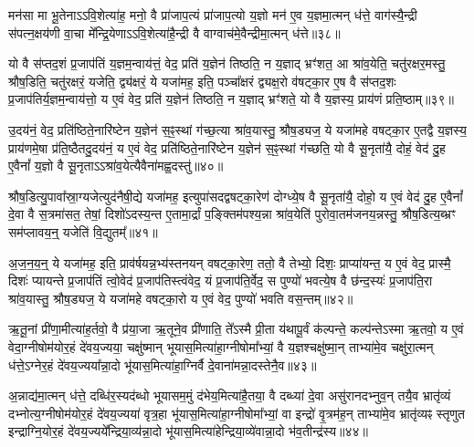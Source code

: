 मन॑सा मा भू॒तेना\-ऽ\-ऽवि॒शेत्या॑ह॒ मनो॒ वै प्रा॑जाप॒त्यं प्रा॑जाप॒त्यो य॒ज्ञो मन॑ ए॒व य॒ज्ञमा॒त्मन् ध॑त्ते॒ वाग॑स्यै॒न्द्री स॑पत्न॒क्षय॑णी वा॒चा मे᳚न्द्रि॒येणा\-ऽ\-ऽवि॒शेत्या॑है॒न्द्री वै वाग्वाच॑मे॒वैन्द्रीमा॒त्मन् ध॑त्ते॥३८॥

{\anuvakamend[{तेनै॒व ब्रह्म॑ रा॒ष्ट्रमे॒वास्य॑ य॒ज्ञस्य॑ प्राजाप॒त्यꣳ षट्त्रिꣳ॑शच्च॥10॥}]}

यो वै स॑प्तद॒शं प्र॒जाप॑तिं य॒ज्ञम॒न्वाय॑त्तं॒ वेद॒ प्रति॑ य॒ज्ञेन॑ तिष्ठति॒ न य॒ज्ञाद् भ्रꣳ॑शत॒ आ श्रा॑व॒येति॒ चतु॑रक्षर॒मस्तु॒ श्रौष॒डिति॒ चतु॑रक्षरं॒ यजेति॒ द्व्य॑क्षरं॒ ये यजा॑मह॒ इति॒ पञ्चा᳚क्षरं द्व्यक्ष॒रो व॑षट्का॒र ए॒ष वै स॑प्तद॒शः प्र॒जाप॑तिर्य॒ज्ञम॒न्वाय॑त्तो॒ य ए॒वं वेद॒ प्रति॑ य॒ज्ञेन॑ तिष्ठति॒ न य॒ज्ञाद् भ्रꣳ॑शते॒ यो वै य॒ज्ञस्य॒ प्राय॑णं प्रति॒ष्ठाम्॥३९॥

उ॒दय॑नं॒ वेद॒ प्रति॑ष्ठिते॒नारि॑ष्टेन य॒ज्ञेन॑ स॒ꣴ॒स्थां ग॑च्छ॒त्या श्रा॑व॒यास्तु॒ श्रौष॒ड्यज॒ ये यजा॑महे वषट्का॒र ए॒तद्वै य॒ज्ञस्य॒ प्राय॑णमे॒षा प्र॑ति॒ष्ठैतदु॒दय॑नं॒ य ए॒वं वेद॒ प्रति॑ष्ठिते॒नारि॑ष्टेन य॒ज्ञेन॑ स॒ꣴ॒स्थां ग॑च्छति॒ यो वै सू॒नृता॑यै॒ दोहं॒ वेद॑ दु॒ह ए॒वैनां᳚ य॒ज्ञो वै सू॒नृता\-ऽ\-ऽश्रा॑व॒येत्यैवैना॑मह्व॒दस्तु॑॥४०॥

श्रौष॒डित्यु॒पावा᳚स्रा॒ग्यजेत्युद॑नैषी॒द्ये यजा॑मह॒ इत्युपा॑सदद्वषट्का॒रेण॑ दोग्ध्ये॒ष वै सू॒नृता॑यै॒ दोहो॒ य ए॒वं वेद॑ दु॒ह ए॒वैनां᳚ दे॒वा वै स॒त्रमा॑सत॒ तेषां॒ दिशो॑\-ऽदस्य॒न्त ए॒तामा॒र्द्रां प॒ङ्क्तिम॑पश्य॒न्ना श्रा॑व॒येति॑ पुरोवा॒तम॑जनय॒न्नस्तु॒ श्रौष॒डित्य॒ब्भ्रꣳ सम॑प्लावय॒न्॒ यजेति॑ वि॒द्युतम्᳚॥४१॥

अ॒ज॒न॒य॒न्॒ ये यजा॑मह॒ इति॒ प्राव॑र्\mbox{}षयन्न॒भ्य॑स्तनयन् वषट्का॒रेण॒ ततो॒ वै तेभ्यो॒ दिशः॒ प्राप्या॑यन्त॒ य ए॒वं वेद॒ प्रास्मै॒ दिशः॑ प्यायन्ते प्र॒जाप॑तिं त्वो॒वेद॑ प्र॒जाप॑तिस्त्वंवेद॒ यं प्र॒जाप॑ति॒र्वेद॒ स पुण्यो॑ भवत्ये॒ष वै छ॑न्द॒स्यः॑ प्र॒जाप॑ति॒रा श्रा॑व॒यास्तु॒ श्रौष॒ड्यज॒ ये यजा॑महे वषट्का॒रो य ए॒वं वेद॒ पुण्यो॑ भवति वस॒न्तम्॥४२॥

ऋ॒तू॒नां प्री॑णा॒मीत्या॑ह॒र्तवो॒ वै प्र॑या॒जा ऋ॒तूने॒व प्री॑णाति॒ ते᳚\-ऽस्मै प्री॒ता य॑थापू॒र्वं क॑ल्पन्ते॒ कल्प॑न्ते\-ऽस्मा ऋ॒तवो॒ य ए॒वं वेदा॒ग्नीषोम॑योर॒हं दे॑वय॒ज्यया॒ चक्षु॑ष्मान् भूयास॒मित्या॑हा॒ग्नीषोमा᳚भ्यां॒ वै य॒ज्ञश्चक्षु॑ष्मा॒न् ताभ्या॑मे॒व चक्षु॑रा॒त्मन् ध॑त्ते॒\-ऽग्नेर॒हं दे॑वय॒ज्यया᳚न्ना॒दो भू॑यास॒मित्या॑हा॒ग्निर्वै दे॒वाना॑मन्ना॒दस्तेनै॒व॥४३॥

अ॒न्नाद्य॑मा॒त्मन् ध॑त्ते॒ दब्धि॑र॒स्यद॑ब्धो भूयासम॒मुं द॑भेय॒मित्या॑है॒तया॒ वै दब्ध्या॑ दे॒वा असु॑रानदभ्नुव॒न् तयै॒व भ्रातृ॑व्यं दभ्नोत्य॒ग्नीषोम॑योर॒हं दे॑वय॒ज्यया॑ वृत्र॒हा भू॑यास॒मित्या॑हा॒ग्नीषोमा᳚भ्यां॒ वा इन्द्रो॑ वृ॒त्रम॑ह॒न् ताभ्या॑मे॒व भ्रातृ॑व्यꣴ स्तृणुत इन्द्राग्नि॒योर॒हं दे॑वय॒ज्यये᳚न्द्रिया॒व्य॑न्ना॒दो भू॑यास॒मित्या॑हेन्द्रिया॒व्ये॑वान्ना॒दो भ॑व॒तीन्द्र॑स्य॥४४॥


